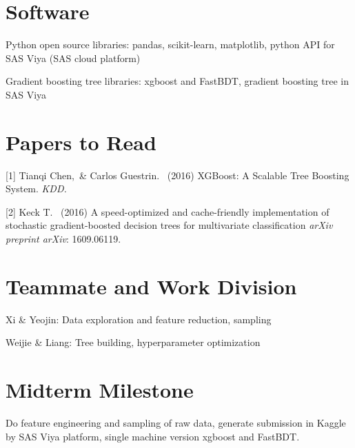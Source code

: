 \documentclass{article}
\begin{document}
\section{Software}

Python open source libraries: pandas, scikit-learn, matplotlib, python API for SAS Viya (SAS cloud platform)

Gradient boosting tree libraries: xgboost and FastBDT, gradient boosting tree in SAS Viya

\section{Papers to Read}


[1] Tianqi Chen,\ \& Carlos Guestrin. \ (2016) XGBoost: A Scalable Tree Boosting System. {\it KDD.}

[2] Keck T. \ (2016) A speed-optimized and cache-friendly implementation of stochastic gradient-boosted decision trees for multivariate classification {\it arXiv preprint arXiv}: 1609.06119.



\section{Teammate and Work Division}

Xi \& Yeojin: Data exploration and feature reduction, sampling

Weijie \& Liang: Tree building, hyperparameter optimization





\section{Midterm Milestone}
Do feature engineering and sampling of raw data, generate submission in Kaggle by SAS Viya platform, single machine version xgboost and FastBDT.
\end{document}

